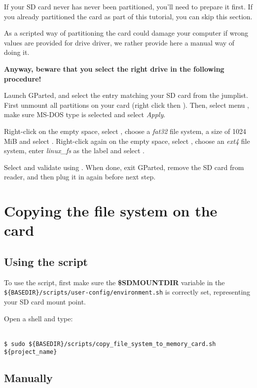 \documentclass[openany,a4paper]{book}
\begin{document}
If your SD card never has never been partitioned, you'll need to prepare it first.
If you already partitioned the card as part of this tutorial, you can skip this section.

As a scripted way of partitioning the card could damage your computer if wrong values are provided for drive driver, we rather provide here a manual way of doing it.

\textbf{Anyway, beware that you select the right drive in the following procedure!}

Launch GParted, and select the entry matching your SD card from the jumplist.
First unmount all partitions on your card (right click then ).
Then, select menu , make sure MS-DOS type is selected and select \textit{Apply}.

Right-click on the empty space, select , choose a \textit{fat32} file system, a size of 1024 MiB and select .
Right-click again on the empty space, select , choose an \textit{ext4} file system, enter \textit{linux\_fs} as the label and select .

Select  and validate using .
When done, exit GParted, remove the SD card from reader, and then plug it in again before next step.

\section{Copying the file system on the card}

\subsection{Using the script}

To use the script, first make sure the \textbf{\$SDMOUNTDIR} variable in the \nolinkurl{${BASEDIR}/scripts/user-config/environment.sh} is correctly set, representing your SD card mount point.

Open a shell and type:
\begin{tabbing}
\kill \hspace{1cm} \= \\
\> \texttt{\$ sudo \$\{BASEDIR\}/scripts/copy\_file\_system\_to\_memory\_card.sh \$\{project\_name\}} \\
\end{tabbing}

\subsection{Manually}
\end{document}
